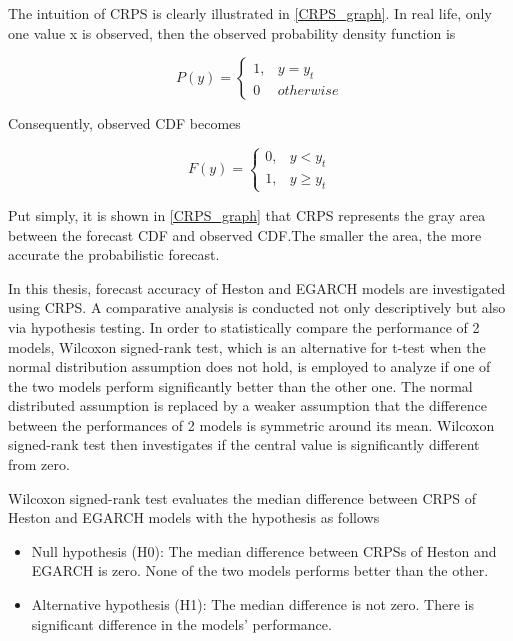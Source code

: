 \documentclass[12pt,a4paper]{article}
\newcommand\colorAutoref[1]{{\hypersetup{linkcolor=black}\autoref{#1}}}
\numberwithin{equation}{section}
\begin{document}
The intuition of CRPS is clearly illustrated in \colorAutoref{CRPS_graph}. In real life, only one value x is observed, then the observed probability density function is 

\begin{equation*}
P(y) = 
\begin{cases}
 1, & y = y_t \\
 0 & otherwise
\end{cases}
\end{equation*}

Consequently, observed CDF becomes

\begin{equation*}
F(y) = 
\begin{cases}
 0, & y < y_t \\
 1, & y \geq y_t
\end{cases}
\end{equation*}
 
Put simply, it is shown in \colorAutoref{CRPS_graph} that CRPS represents the gray area between the forecast CDF and observed CDF.The smaller the area, the more accurate the probabilistic forecast. 

In this thesis, forecast accuracy of Heston and EGARCH models are investigated using CRPS. A comparative analysis is conducted not only descriptively but also via hypothesis testing. In order to statistically compare the performance of 2 models, Wilcoxon signed-rank test, which is an alternative for t-test when the normal distribution assumption does not hold, is employed to analyze if one of the two models perform significantly better than the other one. The normal distributed assumption is replaced by a weaker assumption that the difference between the performances of 2 models is symmetric around its mean. Wilcoxon signed-rank test then investigates if the central value is significantly different from zero.

Wilcoxon signed-rank test evaluates the median difference between CRPS of Heston and EGARCH models with the hypothesis as follows

\begin{itemize}
\item Null hypothesis (H0): The median difference between CRPSs of Heston and EGARCH is zero. None of the two models performs better than the other.

\item Alternative hypothesis (H1): The median difference is not zero. There is significant difference in the models' performance.
\end{itemize}
\end{document}

